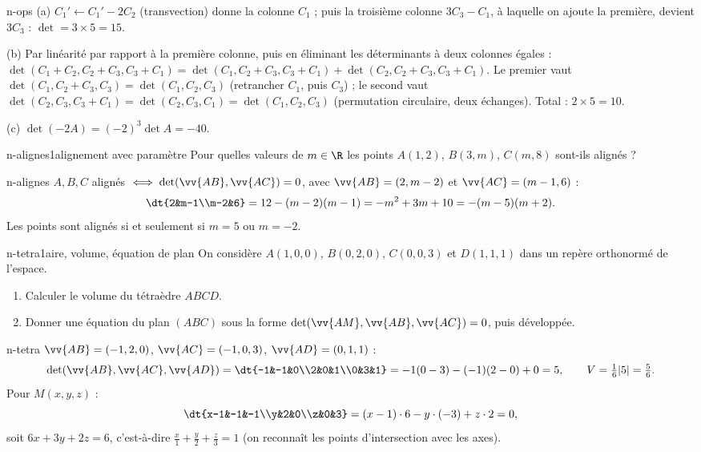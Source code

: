 \begin{corrige}{n-ops}
(a) $C_1'\leftarrow C_1'-2C_2$ (transvection) donne la colonne $C_1$ ; puis la troisième colonne $3C_3-C_1$, à laquelle on ajoute la première, devient $3C_3$ : $\det=3\times5=15$.

(b) Par linéarité par rapport à la première colonne, puis en éliminant les déterminants à deux colonnes égales :
$\det(C_1+C_2,C_2+C_3,C_3+C_1)=\det(C_1,C_2+C_3,C_3+C_1)+\det(C_2,C_2+C_3,C_3+C_1)$. Le premier vaut $\det(C_1,C_2+C_3,C_3)=\det(C_1,C_2,C_3)$ (retrancher $C_1$, puis $C_3$) ; le second vaut $\det(C_2,C_3,C_3+C_1)=\det(C_2,C_3,C_1)=\det(C_1,C_2,C_3)$ (permutation circulaire, deux échanges). Total : $2\times5=10$.

(c) $\det(-2A)=(-2)^3\det A=-40$.
\end{corrige}

\begin{exo}{n-alignes}{1}{alignement avec paramètre}
Pour quelles valeurs de $m\in\R$ les points $A(1,2)$, $B(3,m)$, $C(m,8)$ sont-ils alignés ?
\end{exo}

\begin{corrige}{n-alignes}
$A,B,C$ alignés $\iff\det(\vv{AB},\vv{AC})=0$, avec $\vv{AB}=(2,m-2)$ et $\vv{AC}=(m-1,6)$ :
\[\dt{2&m-1\\m-2&6}=12-(m-2)(m-1)=-m^2+3m+10=-(m-5)(m+2).\]
Les points sont alignés si et seulement si $m=5$ ou $m=-2$.
\end{corrige}

\begin{exo}{n-tetra}{1}{aire, volume, équation de plan}
On considère $A(1,0,0)$, $B(0,2,0)$, $C(0,0,3)$ et $D(1,1,1)$ dans un repère orthonormé de l'espace.
\begin{enumerate}
\item Calculer le volume du tétraèdre $ABCD$.
\item Donner une équation du plan $(ABC)$ sous la forme $\det(\vv{AM},\vv{AB},\vv{AC})=0$, puis développée.
\end{enumerate}
\end{exo}

\begin{corrige}{n-tetra}
 $\vv{AB}=(-1,2,0)$, $\vv{AC}=(-1,0,3)$, $\vv{AD}=(0,1,1)$ :
\[\det(\vv{AB},\vv{AC},\vv{AD})=\dt{-1&-1&0\\2&0&1\\0&3&1}=-1(0-3)-(-1)(2-0)+0=5,\qquad V=\tfrac16|5|=\tfrac56.\]
 Pour $M(x,y,z)$ :
\[\dt{x-1&-1&-1\\y&2&0\\z&0&3}=(x-1)\cdot6-y\cdot(-3)+z\cdot2=0,\]
soit $6x+3y+2z=6$, c'est-à-dire $\frac x1+\frac y2+\frac z3=1$ (on reconnaît les points d'intersection avec les axes).
\end{corrige}

